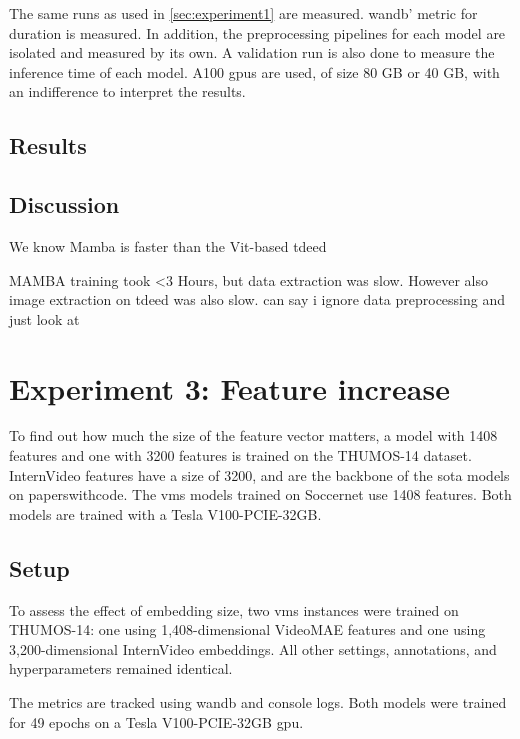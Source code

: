 The same runs as used in \autoref{sec:experiment1} are measured. \acrlong{wandb}' metric for duration is measured. In addition, the preprocessing pipelines for each model are isolated and measured by its own. A validation run is also done to measure the inference time of each model. A100 \acrshort{gpu}s are used, of size 80 GB or 40 GB, with an indifference to interpret the results. 

\subsection{Results}
\label{ssec:ex2_result}

\subsection{Discussion}
\label{ssec:ex2_discussion}

We know Mamba is faster than the Vit-based tdeed

MAMBA training took <3 Hours, but data extraction was slow. However also image extraction on tdeed was also slow. can say i ignore data preprocessing and just look at 


\section{Experiment 3: Feature increase}
\label{sec:experiment3}
To find out how much the size of the feature vector matters, a model with 1408 features and one with 3200 features is trained on the THUMOS-14 dataset.
InternVideo features have a size of 3200, and are the backbone of the \acrshort{sota} models on paperswithcode. The \acrshort{vms} models trained on Soccernet use 1408 features. Both models are trained with a Tesla V100-PCIE-32GB.


\subsection{Setup}
\label{ssec:ex3_setup}

To assess the effect of embedding size, two \acrshort{vms} instances were trained on THUMOS-14\cite{dataset:thumos}: one using 1,408-dimensional VideoMAE features and one using 3,200-dimensional InternVideo embeddings. All other settings, annotations, and hyperparameters remained identical.

The metrics are tracked using \acrlong{wandb} and console logs.
Both models were trained for 49 epochs on a Tesla V100-PCIE-32GB \acrshort{gpu}.

